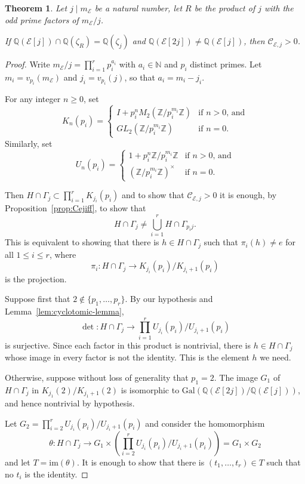 \documentclass{amsart}
\theoremstyle{plain}
\newtheorem{theorem}{Theorem}[section]
\theoremstyle{remark}
\newcommand{\N}{\mathbb{N}}
\newcommand{\Q}{\mathbb{Q}}
\newcommand{\Z}{\mathbb{Z}}
\newcommand{\E}{\mathcal{E}}
\newcommand{\Cc}{\mathcal{C}}
\newcommand{\Gal}{\mathrm{Gal}}
\newcommand{\im}{\mathrm{im}}
\begin{document}
\begin{theorem} \label{T4b}
    Let $j \mid m_\E$ be a natural number, let $R$ be the product of $j$ with the odd prime factors of $m_\E/j$.
    
    If $\mathbb{Q}(\E[j]) \cap \mathbb{Q}(\zeta_{R}) =\mathbb{Q}(\zeta_{j}) $ and $\mathbb{Q}(\E[2j]) \neq \mathbb{Q}(\E[j])$, then $\mathcal{C}_{\E,j}>0$.
\end{theorem}
\begin{proof}
    Write $m_\E/j = \prod_{i=1}^r p_i^{a_i}$ with $a_i \in \N$ and $p_i$ distinct primes. Let $m_i = v_{p_i}(m_\E)$ and $j_i = v_{p_i}(j)$, so that $a_i = m_i - j_i$. 

    For any integer $n\ge 0$, set 
    \[K_n(p_i) = \begin{cases}
        I + p_i^nM_2(\Z/p_i^{m_i}\Z) & \text{if $n > 0$, and}\\
        GL_2(\Z/p_i^{m_i}\Z) & \text{if $n = 0$.}
    \end{cases}\]
    Similarly, set 
     \[U_n(p_i) = \begin{cases}
        1 + p_i^n\Z/p_i^{m_i}\Z & \text{if $n > 0$, and}\\
        (\Z/p_i^{m_i}\Z)^\times & \text{if $n = 0$.}
    \end{cases}\]

    Then $H \cap \Gamma_j \subset \prod_{i=1}^r K_{j_i}(p_i)$ and to show that $\Cc_{\E,j} > 0$ it is enough, by Proposition~\ref{prop:Cejiff}, to show that 
    \[H \cap \Gamma_j \ne \bigcup_{i=1}^r H \cap \Gamma_{p_ij}.\]
    This is equivalent to showing that there is $h \in H \cap \Gamma_j$ such that $\pi_i(h) \ne e$ for all $1 \le i \le r$, where 
    \[\pi_i : H \cap \Gamma_j \to K_{j_i}(p_i)/K_{j_i + 1}(p_i)\]
    is the projection.

    Suppose first that $2 \not \in \{p_1, \ldots, p_r\}$. By our hypothesis and Lemma~\ref{lem:cyclotomic-lemma}, 
    \[\det : H \cap \Gamma_j \to \prod_{i=1}^r U_{j_i}(p_i)/U_{j_i+1}(p_i)\]
    is surjective. Since each factor in this product is nontrivial, there is $h \in H \cap \Gamma_j$ whose image in every factor is not the identity. This is the element $h$ we need.

    Otherwise, suppose without loss of generality that $p_1 = 2$. The image $G_1$ of $H\cap \Gamma_j$ in $K_{j_1}(2)/K_{j_1 + 1}(2)$ is isomorphic to $\Gal(\Q(\E[2j])/\Q(\E[j]))$, and hence nontrivial by hypothesis.

    Let $G_2 = \prod_{i=2}^rU_{j_i}(p_i)/U_{j_i + 1}(p_i)$ and consider the homomorphism 
    \[\theta : H \cap \Gamma_j \to G_1 \times \left(\prod_{i=2}^r U_{j_i}(p_i)/U_{j_i + 1}(p_i)\right) = G_1 \times G_2\]
    and let $T = \im(\theta)$. It is enough to show that there is $(t_1, \ldots, t_r) \in T$ such that no $t_i$ is the identity.
    

\end{proof}
\end{document}
